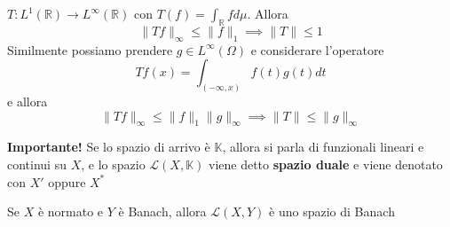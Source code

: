\begin{example}
    \(T : L^{1}{(\mathbb{R})} \to L^{\infty}{(\mathbb{R})}\) con \(T{(f)} =
    \int_{\mathbb{R}} f d\mu\). Allora
    \[
        \|Tf\|_{\infty} \le \|f\|_1 \implies \|T\| \le 1
    \]
    Similmente possiamo prendere \(g \in L^{\infty}{(\Omega)}\) e considerare
    l'operatore
    \[
        Tf{(x)} = \int_{(-\infty, x)} f{(t)}g{(t)}dt
    \]
    e allora
    \[
        \|Tf\|_{\infty} \le \|f\|_1 \|g\|_\infty \implies \|T\| \le \|g\|_\infty
    \]
\end{example}
\textbf{Importante!} Se lo spazio di arrivo è \(\mathbb{K}\), allora si parla di
funzionali lineari e continui su \(X\), e lo spazio \(\mathcal{L}{(X,
\mathbb{K})}\) viene detto \textbf{spazio duale} e viene denotato con \(X'\)
oppure \(X^{*}\) 
\begin{theorem}
    Se \(X\) è normato e \(Y\) è Banach, allora \(\mathcal{L}{(X, Y)}\) è uno
    spazio di Banach
\end{theorem}
